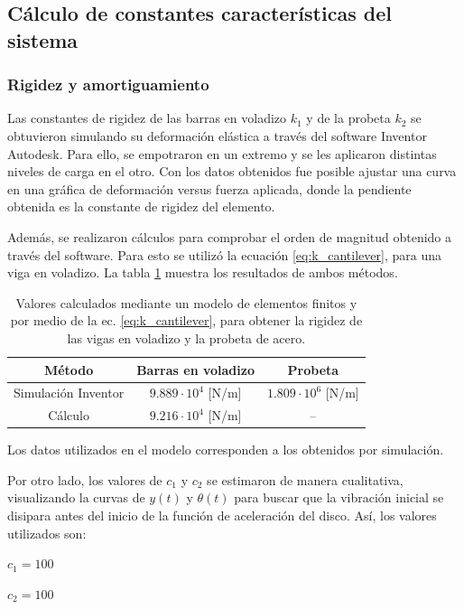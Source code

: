 \subsection{Cálculo de constantes características del sistema}
 
\subsubsection{Rigidez y amortiguamiento} Las constantes de rigidez de las barras en voladizo $k_1$ y de la probeta $k_2$ se obtuvieron simulando su deformación elástica a través del software Inventor Autodesk. Para ello, se empotraron en un extremo y se les aplicaron distintas niveles de carga en el otro. Con los datos obtenidos fue posible ajustar una curva en una gráfica de deformación versus fuerza aplicada, donde la pendiente obtenida es la constante de rigidez del elemento. 

Además, se realizaron cálculos para comprobar el orden de magnitud obtenido a través del software. Para esto se utilizó la ecuación \ref{eq:k_cantilever}, para una viga en voladizo. La tabla \ref{tab:k_valor} muestra los resultados de ambos métodos.
\begin{table}[h]
\centering
\begin{tabular}{ccc}
\hline
Método & Barras en voladizo & Probeta \\ \hline
Simulación Inventor & $9.889\cdot 10^4$ [N/m] & $1.809\cdot 10^6$ [N/m] \\
Cálculo & $9.216\cdot 10^4$ [N/m] & -- \\ \hline
\end{tabular}
\caption{Valores calculados mediante un modelo de elementos finitos y por medio de la ec. \ref{eq:k_cantilever}, para obtener la rigidez de las vigas en voladizo y la probeta de acero.}
\label{tab:k_valor}
\end{table}
Los datos utilizados en el modelo corresponden a los obtenidos por simulación.

Por otro lado, los valores de $c_1$ y $c_2$ se estimaron de manera cualitativa, visualizando la curvas de $y(t)$ y $\theta(t)$ para buscar que la vibración inicial se disipara antes del inicio de la función de aceleración del disco. Así, los valores utilizados son:
\begin{itemize*}
	\item $c_1= 100$
	\item $c_2= 100$ 
\end{itemize*}
